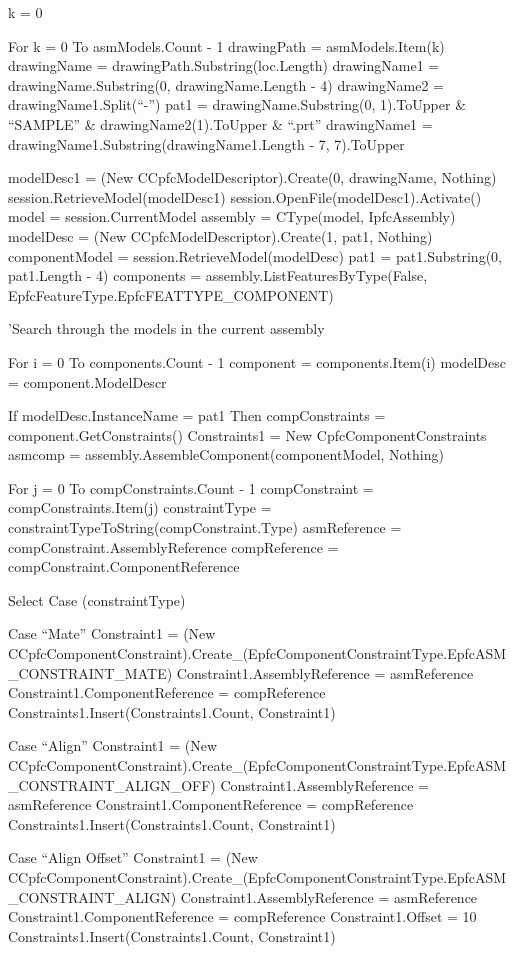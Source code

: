\documentclass[]{article}
\begin{document}
k = 0

For k = 0 To asmModels.Count - 1 drawingPath = asmModels.Item(k)
drawingName = drawingPath.Substring(loc.Length) drawingName1 =
drawingName.Substring(0, drawingName.Length - 4) drawingName2 =
drawingName1.Split(``-'') pat1 = drawingName.Substring(0, 1).ToUpper \&
``SAMPLE'' \& drawingName2(1).ToUpper \& ``.prt'' drawingName1 =
drawingName1.Substring(drawingName1.Length - 7, 7).ToUpper

modelDesc1 = (New CCpfcModelDescriptor).Create(0, drawingName, Nothing)
session.RetrieveModel(modelDesc1)
session.OpenFile(modelDesc1).Activate() model = session.CurrentModel
assembly = CType(model, IpfcAssembly) modelDesc = (New
CCpfcModelDescriptor).Create(1, pat1, Nothing) componentModel =
session.RetrieveModel(modelDesc) pat1 = pat1.Substring(0, pat1.Length -
4) components = assembly.ListFeaturesByType(False,
EpfcFeatureType.EpfcFEATTYPE\_COMPONENT)

'Search through the models in the current assembly

For i = 0 To components.Count - 1 component = components.Item(i)
modelDesc = component.ModelDescr

If modelDesc.InstanceName = pat1 Then compConstraints =
component.GetConstraints() Constraints1 = New CpfcComponentConstraints
asmcomp = assembly.AssembleComponent(componentModel, Nothing)

For j = 0 To compConstraints.Count - 1 compConstraint =
compConstraints.Item(j) constraintType =
constraintTypeToString(compConstraint.Type) asmReference =
compConstraint.AssemblyReference compReference =
compConstraint.ComponentReference

Select Case (constraintType)

Case ``Mate'' Constraint1 = (New
CCpfcComponentConstraint).Create\_(EpfcComponentConstraintType.EpfcASM\_CONSTRAINT\_MATE)
Constraint1.AssemblyReference = asmReference
Constraint1.ComponentReference = compReference
Constraints1.Insert(Constraints1.Count, Constraint1)

Case ``Align'' Constraint1 = (New
CCpfcComponentConstraint).Create\_(EpfcComponentConstraintType.EpfcASM\_CONSTRAINT\_ALIGN\_OFF)
Constraint1.AssemblyReference = asmReference
Constraint1.ComponentReference = compReference
Constraints1.Insert(Constraints1.Count, Constraint1)

Case ``Align Offset'' Constraint1 = (New
CCpfcComponentConstraint).Create\_(EpfcComponentConstraintType.EpfcASM\_CONSTRAINT\_ALIGN)
Constraint1.AssemblyReference = asmReference
Constraint1.ComponentReference = compReference Constraint1.Offset = 10
Constraints1.Insert(Constraints1.Count, Constraint1)
\end{document}
